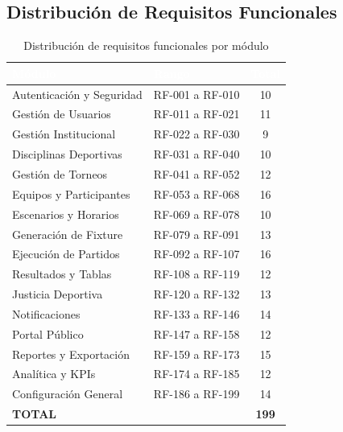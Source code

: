\documentclass[12pt,a4paper]{article}
\begin{document}
\subsection{Distribución de Requisitos Funcionales}

\begin{table}[h]
\centering
\begin{tabular}{|l|l|c|}
\hline
\rowcolor{headercolor}
\textcolor{white}{\textbf{Módulo}} & \textcolor{white}{\textbf{Rango}} & \textcolor{white}{\textbf{Total}} \\
\hline
Autenticación y Seguridad & RF-001 a RF-010 & 10 \\
\hline
\rowcolor{rowgray}
Gestión de Usuarios & RF-011 a RF-021 & 11 \\
\hline
Gestión Institucional & RF-022 a RF-030 & 9 \\
\hline
\rowcolor{rowgray}
Disciplinas Deportivas & RF-031 a RF-040 & 10 \\
\hline
Gestión de Torneos & RF-041 a RF-052 & 12 \\
\hline
\rowcolor{rowgray}
Equipos y Participantes & RF-053 a RF-068 & 16 \\
\hline
Escenarios y Horarios & RF-069 a RF-078 & 10 \\
\hline
\rowcolor{rowgray}
Generación de Fixture & RF-079 a RF-091 & 13 \\
\hline
Ejecución de Partidos & RF-092 a RF-107 & 16 \\
\hline
\rowcolor{rowgray}
Resultados y Tablas & RF-108 a RF-119 & 12 \\
\hline
Justicia Deportiva & RF-120 a RF-132 & 13 \\
\hline
\rowcolor{rowgray}
Notificaciones & RF-133 a RF-146 & 14 \\
\hline
Portal Público & RF-147 a RF-158 & 12 \\
\hline
\rowcolor{rowgray}
Reportes y Exportación & RF-159 a RF-173 & 15 \\
\hline
Analítica y KPIs & RF-174 a RF-185 & 12 \\
\hline
\rowcolor{rowgray}
Configuración General & RF-186 a RF-199 & 14 \\
\hline
\textbf{TOTAL} & & \textbf{199} \\
\hline
\end{tabular}
\caption{Distribución de requisitos funcionales por módulo}
\end{table}



\newpage
\end{document}
